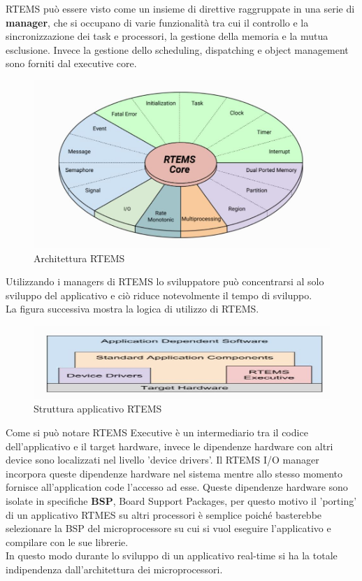\documentclass[12pt, a4paper, titlepage, oneside]{book}
\begin{document}
\begin{flushleft}
\newpage
RTEMS può essere visto come un insieme di direttive raggruppate in una serie di \textbf{manager}, che si occupano di varie funzionalità tra cui il controllo e la sincronizzazione dei task e processori, la gestione della memoria e la mutua esclusione. Invece la gestione dello scheduling, dispatching e object management sono forniti dal executive core.
\begin{figure} [h]
    \centering
    \includegraphics[scale = 0.80]{rtems_internal_architecture.JPG}
    \caption{Architettura RTEMS}
    \label{fig:my_label1}
\end{figure}

Utilizzando i managers di RTEMS lo sviluppatore può concentrarsi al solo sviluppo del applicativo e ciò riduce notevolmente il tempo di sviluppo.\\

La figura successiva mostra la logica di utilizzo di RTEMS.
\begin{figure}[ht]
    \centering
    \includegraphics[scale = 0.80]{application_architecture.JPG}
    \caption{Struttura applicativo RTEMS}
    \label{fig:my_label2}
\end{figure}

Come si può notare RTEMS Executive è un intermediario tra il codice dell'applicativo e il target hardware, invece le dipendenze hardware con altri device sono localizzati nel livello 'device drivers'.
Il RTEMS I/O manager incorpora queste dipendenze hardware nel sistema mentre allo stesso momento fornisce all'application code l'accesso ad esse.
Queste dipendenze hardware sono isolate in specifiche \textbf{BSP}, Board Support Packages, per questo motivo il 'porting' di un applicativo RTMES su altri processori è semplice poiché basterebbe selezionare la BSP del microprocessore su cui si vuol eseguire l'applicativo e compilare con le sue librerie.\\
In questo modo durante lo sviluppo di un applicativo real-time si ha la totale indipendenza dall'architettura dei microprocessori. \\


\end{flushleft}
\end{document}
